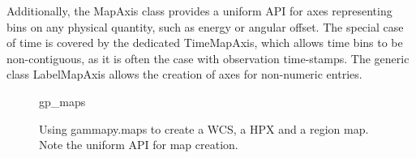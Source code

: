 Additionally, the MapAxis class provides a uniform API for axes representing bins on any physical quantity, such as energy or angular offset. The special case of time is covered by the dedicated TimeMapAxis, which allows time bins to be non-contiguous, as it is often the case with observation time-stamps. The generic class LabelMapAxis allows the creation of axes for non-numeric entries.


\begin{figure}
	{gp_maps}
	
	\caption{Using gammapy.maps to create a WCS, a HPX and a region map. Note the uniform API for map creation.}
	\label{ig*:minted:gp_maps}
\end{figure}